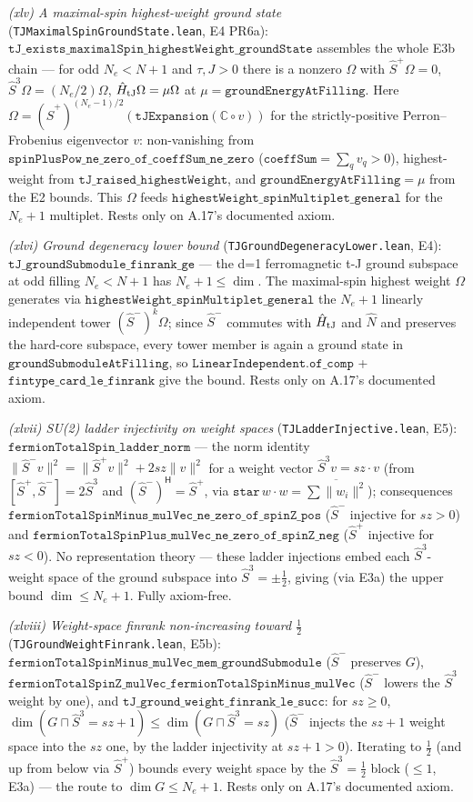 \documentclass[a4paper,11pt]{article}
\begin{document}
\emph{(xlv) A maximal-spin highest-weight ground state} (\texttt{TJMaximalSpinGroundState.lean}, E4
PR6a): $\texttt{tJ\_exists\_maximalSpin\_highestWeight\_groundState}$ assembles the whole E3b chain ---
for odd $N_e<N+1$ and $\tau,J>0$ there is a nonzero $\Omega$ with $\hat S^+\Omega=0$, $\hat
S^3\Omega=(N_e/2)\Omega$, $\hat H_{\rm tJ}\Omega=\mu\Omega$ at $\mu=\texttt{groundEnergyAtFilling}$.
Here $\Omega=(\hat S^+)^{(N_e-1)/2}(\texttt{tJExpansion}(\mathbb C\circ v))$ for the strictly-positive
Perron--Frobenius eigenvector $v$: non-vanishing from
$\texttt{spinPlusPow\_ne\_zero\_of\_coeffSum\_ne\_zero}$ ($\texttt{coeffSum}=\sum_q v_q>0$),
highest-weight from $\texttt{tJ\_raised\_highestWeight}$, and
$\texttt{groundEnergyAtFilling}=\mu$ from the E2 bounds.  This $\Omega$ feeds
$\texttt{highestWeight\_spinMultiplet\_general}$ for the $N_e+1$ multiplet.  Rests only on A.17's
documented axiom.

\emph{(xlvi) Ground degeneracy lower bound} (\texttt{TJGroundDegeneracyLower.lean}, E4):
$\texttt{tJ\_groundSubmodule\_finrank\_ge}$ --- the d=1 ferromagnetic t-J ground subspace at odd
filling $N_e<N+1$ has $N_e+1\le\dim$.  The maximal-spin highest weight $\Omega$ generates via
$\texttt{highestWeight\_spinMultiplet\_general}$ the $N_e+1$ linearly independent tower $(\hat
S^-)^k\Omega$; since $\hat S^-$ commutes with $\hat H_{\rm tJ}$ and $\hat N$ and preserves the
hard-core subspace, every tower member is again a ground state in
$\texttt{groundSubmoduleAtFilling}$, so $\texttt{LinearIndependent.of\_comp}$ +
$\texttt{fintype\_card\_le\_finrank}$ give the bound.  Rests only on A.17's documented axiom.

\emph{(xlvii) SU(2) ladder injectivity on weight spaces} (\texttt{TJLadderInjective.lean}, E5):
$\texttt{fermionTotalSpin\_ladder\_norm}$ --- the norm identity $\|\hat S^- v\|^2=\|\hat S^+ v\|^2+2sz
\|v\|^2$ for a weight vector $\hat S^3 v=sz\cdot v$ (from $[\hat S^+,\hat S^-]=2\hat S^3$ and $(\hat
S^-)^{\mathsf H}=\hat S^+$, via $\texttt{star}\,w\cdot w=\overline{\sum\|w_i\|^2}$); consequences
$\texttt{fermionTotalSpinMinus\_mulVec\_ne\_zero\_of\_spinZ\_pos}$ ($\hat S^-$ injective for $sz>0$)
and $\texttt{fermionTotalSpinPlus\_mulVec\_ne\_zero\_of\_spinZ\_neg}$ ($\hat S^+$ injective for
$sz<0$).  No representation theory --- these ladder injections embed each $\hat S^3$-weight space of
the ground subspace into $\hat S^3=\pm\tfrac12$, giving (via E3a) the upper bound $\dim\le N_e+1$.
Fully axiom-free.

\emph{(xlviii) Weight-space finrank non-increasing toward $\tfrac12$} (\texttt{TJGroundWeightFinrank.lean},
E5b): $\texttt{fermionTotalSpinMinus\_mulVec\_mem\_groundSubmodule}$ ($\hat S^-$ preserves $G$),
$\texttt{fermionTotalSpinZ\_mulVec\_fermionTotalSpinMinus\_mulVec}$ ($\hat S^-$ lowers the $\hat S^3$
weight by one), and $\texttt{tJ\_ground\_weight\_finrank\_le\_succ}$: for $sz\ge 0$, $\dim(G\sqcap\hat
S^3{=}sz{+}1)\le\dim(G\sqcap\hat S^3{=}sz)$ ($\hat S^-$ injects the $sz{+}1$ weight space into the $sz$
one, by the ladder injectivity at $sz{+}1>0$).  Iterating to $\tfrac12$ (and up from below via $\hat
S^+$) bounds every weight space by the $\hat S^3=\tfrac12$ block ($\le 1$, E3a) --- the route to
$\dim G\le N_e+1$.  Rests only on A.17's documented axiom.
\end{document}
